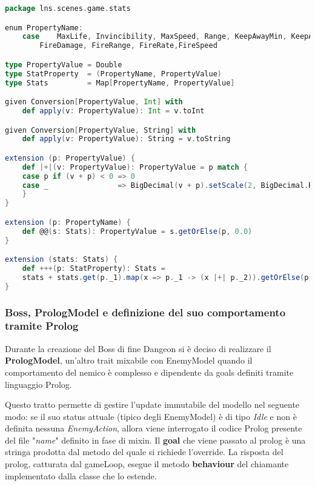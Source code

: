 \begin{lstlisting}[language=Scala]
package lns.scenes.game.stats

enum PropertyName:
	case 	MaxLife, Invincibility, MaxSpeed, Range, KeepAwayMin, KeepAwayMax, Damage, 
		FireDamage, FireRange, FireRate,FireSpeed

type PropertyValue = Double
type StatProperty  = (PropertyName, PropertyValue)
type Stats         = Map[PropertyName, PropertyValue]

given Conversion[PropertyValue, Int] with
	def apply(v: PropertyValue): Int = v.toInt

given Conversion[PropertyValue, String] with
	def apply(v: PropertyValue): String = v.toString

extension (p: PropertyValue) {
	def |+|(v: PropertyValue): PropertyValue = p match {
	case p if (v + p) < 0 => 0
	case _                => BigDecimal(v + p).setScale(2, BigDecimal.RoundingMode.HALF_UP).toDouble
	}
}

extension (p: PropertyName) {
	def @@(s: Stats): PropertyValue = s.getOrElse(p, 0.0)
}

extension (stats: Stats) {
	def +++(p: StatProperty): Stats =
	stats + stats.get(p._1).map(x => p._1 -> (x |+| p._2)).getOrElse(p)
}
\end{lstlisting}

\subsubsection{Boss, PrologModel e definizione del suo comportamento tramite Prolog}
Durante la creazione del Boss di fine Dangeon si è deciso di realizzare il \textbf{PrologModel}, 
un'altro trait mixabile con EnemyModel quando il comportamento del nemico è complesso e dipendente da goals definiti tramite linguaggio Prolog.

Questo tratto permette di gestire l'update immutabile del modello nel seguente modo:
se il suo status attuale (tipico degli EnemyModel) è di tipo \textit{Idle} e non è definita nessuna \textit{EnemyAction}, 
allora viene interrogato il codice Prolog presente del file "\textit{name}" definito in fase di mixin.
Il \textbf{goal} che viene passato al prolog è una stringa prodotta dal metodo del quale si richiede l'override.
La risposta del prolog, catturata dal gameLoop, esegue il metodo \textbf{behaviour} del chiamante implementato dalla classe che lo estende. 

